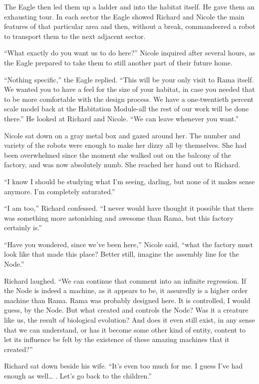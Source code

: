 \documentclass[]{article}
\begin{document}
{The Eagle then led them up a ladder and into the habitat itself. He gave them an exhausting tour. In each sector the Eagle showed Richard and Nicole the main features of that particular area and then, without a break, commandeered a robot to transport them to the next adjacent sector.

“What exactly do you want us to do here?” Nicole inquired after several hours, as the Eagle prepared to take them to still another part of their future home.

“Nothing specific,” the Eagle replied. “This will be your only visit to Rama itself. We wanted you to have a feel for the size of your habitat, in case you needed that to be more comfortable with the design process. We have a one-twentieth percent scale model back at the Habitation Module-all the rest of our work will be done there.” He looked at Richard and Nicole. “We can leave whenever you want.”

Nicole sat down on a gray metal box and gazed around her. The number and variety of the robots were enough to make her dizzy all by themselves. She had been overwhelmed since the moment she walked out on the balcony of the factory, and was now absolutely numb. She reached her hand out to Richard.

“I know I should be studying what I’m seeing, darling, but none of it makes sense anymore. I’m completely saturated.”

“I am too,” Richard confessed. “I never would have thought it possible that there was something more astonishing and awesome than Rama, but this factory certainly is.”

“Have you wondered, since we’ve been here,” Nicole said, “what the factory must look like that made this place? Better still, imagine the assembly line for the Node.”

Richard laughed. “We can continue that comment into an infinite regression. If the Node is indeed a machine, as it appears to be, it assuredly is a higher order machine than Rama. Rama was probably designed here. It is controlled, I would guess, by the Node. But what created and controls the Node? Was it a creature like us, the result of biological evolution? And does it even still exist, in any sense that we can understand, or has it become some other kind of entity, content to let its influence be felt by the existence of these amazing machines that it created?”

Richard sat down beside his wife. “It’s even too much for me. I guess I’ve had enough as well… . Let’s go back to the children.”

}
\end{document}
